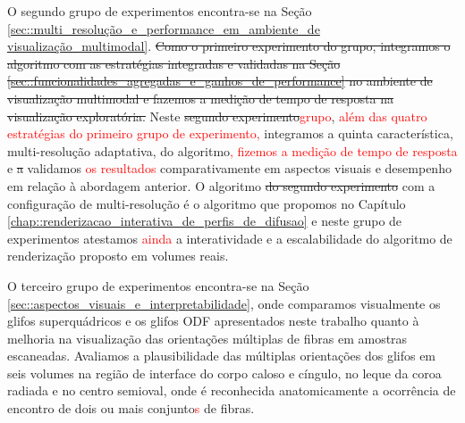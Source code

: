O segundo grupo de experimentos encontra-se na Seção \ref{sec::multi_resolução_e_performance_em_ambiente_de visualização_multimodal}. \sout{Como o primeiro experimento do grupo, integramos o algoritmo com as estratégias integradas e validadas na Seção \ref{sec::funcionalidades_agregadas_e_ganhos_de_performance} no ambiente de visualização multimodal e fazemos a medição de tempo de resposta na visualização exploratória.} Neste \sout{segundo experimento}\textcolor{red}{grupo}, \textcolor{red}{além das quatro estratégias do primeiro grupo de experimento,} integramos a quinta característica, multi-resolução adaptativa, do algoritmo\textcolor{red}{, fizemos a medição de tempo de resposta} e \sout{a} validamos \textcolor{red}{os resultados} comparativamente em aspectos visuais e desempenho em relação à abordagem anterior. O algoritmo \sout{do segundo experimento} com a configuração de multi-resolução é o algoritmo que propomos no Capítulo \ref{chap::renderizacao_interativa_de_perfis_de_difusao} e neste grupo de experimentos atestamos \textcolor{red}{ainda} a interatividade e a escalabilidade do algoritmo de renderização proposto em volumes reais.


O terceiro grupo de experimentos encontra-se na Seção \ref{sec::aspectos_visuais_e_interpretabilidade}, onde comparamos visualmente os glifos superquádricos e os glifos ODF apresentados neste trabalho quanto à melhoria na visualização das orientações múltiplas de fibras em amostras escaneadas. Avaliamos a plausibilidade das múltiplas orientações dos glifos em seis volumes na região de interface do corpo caloso e cíngulo, no leque da coroa radiada e no centro semioval, onde é reconhecida anatomicamente a ocorrência de encontro de dois ou mais conjunto\textcolor{red}{s} de fibras.
 

